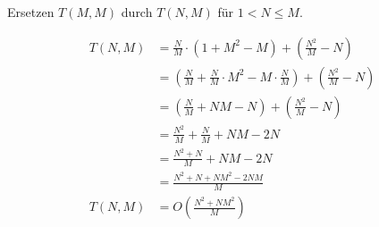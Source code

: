 \documentclass[parskip=half,a4paper]{scrartcl}
\begin{document}
\begin{center}
Ersetzen $T(M,M)$ durch $T(N,M)$ für $1 < N \le M$.
\end{center}

\begin{equation*}
\begin{aligned}
    T(N, M) & =  \frac{N}{M} \cdot \left(1 + M^2 - M\right) + \left(\frac{N^2}{M} - N\right) \\
    & =  \left(\frac{N}{M} + \frac{N}{M} \cdot M^2 - M \cdot \frac{N}{M}\right) + \left(\frac{N^2}{M} - N\right) \\
    & =  \left(\frac{N}{M} + NM - N\right) + \left(\frac{N^2}{M} - N\right) \\
    & =  \frac{N^2}{M} + \frac{N}{M} + NM - 2N \\
    & =  \frac{N^2 + N}{M} + NM - 2N \\
    & =  \frac{N^2 + N + NM^2 - 2NM}{M} \\
    T(N, M) & =  O(\frac{N^2 + NM^2}{M}) \\
\end{aligned}
\end{equation*}
\end{document}
